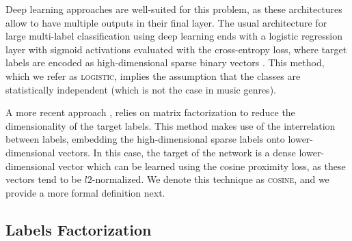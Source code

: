 Deep learning approaches are well-suited for this problem, as these architectures allow to have multiple outputs in their final layer.
The usual architecture for large multi-label classification using deep learning ends with a logistic regression layer with sigmoid activations evaluated with the cross-entropy loss, where target labels are encoded as high-dimensional sparse binary vectors \citep{szegedy2016rethinking}. 
This method, which we refer as \textsc{logistic}, implies the assumption that the classes are statistically independent (which is not the case in music genres).

A more recent approach \citep{Chollet2016}, relies on matrix factorization to reduce the dimensionality of the target labels. 
This method makes use of the interrelation between labels, embedding the high-dimensional sparse labels onto lower-dimensional vectors.
In this case, the target of the network is a dense lower-dimensional vector which can be learned using the cosine proximity loss, as these vectors tend to be $l2$-normalized. 
We denote this technique as \textsc{cosine}, and we provide a more formal definition next.

\subsection{Labels Factorization}\label{sec:multi-class:factorization}




